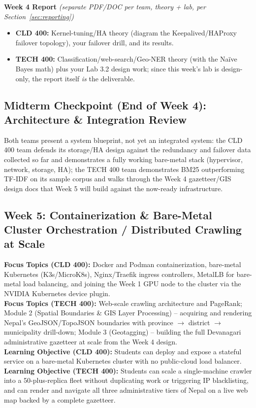 \documentclass[10pt, a4paper]{article}
\newcommand{\weeklyreport}[3]{%
  \par\vspace{0.4em}
  \noindent\colorbox{lightgray!35}{\parbox{\dimexpr\textwidth-2\fboxsep\relax}{%
    \textbf{\color{primary}#1 Report} \textit{(separate PDF/DOC per team, theory + lab, per Section~\ref{sec:reporting})}
    \begin{itemize}
        \item \textbf{CLD 400:} #2
        \item \textbf{TECH 400:} #3
    \end{itemize}
  }}%
  \par\vspace{0.3em}
}
\begin{document}
\weeklyreport{Week 4}{Kernel-tuning/HA theory (diagram the Keepalived/HAProxy failover topology), your failover drill, and its results.}{Classification/web-search/Geo-NER theory (with the Na\"ive Bayes math) plus your Lab 3.2 design work; since this week's lab is design-only, the report itself \emph{is} the deliverable.}

\vspace{0.5em}

\subsection*{Midterm Checkpoint (End of Week 4): Architecture \& Integration Review}
Both teams present a system blueprint, not yet an integrated system: the CLD 400 team defends its storage/HA design against the redundancy and failover data collected so far and demonstrates a fully working bare-metal stack (hypervisor, network, storage, HA); the TECH 400 team demonstrates BM25 outperforming TF-IDF on its sample corpus and walks through the Week 4 gazetteer/GIS design docs that Week 5 will build against the now-ready infrastructure.

\newpage

\subsection*{Week 5: Containerization \& Bare-Metal Cluster Orchestration / Distributed Crawling at Scale}
\textbf{Focus Topics (CLD 400):} Docker and Podman containerization, bare-metal Kubernetes (K3s/MicroK8s), Nginx/Traefik ingress controllers, MetalLB for bare-metal load balancing, and joining the Week 1 GPU node to the cluster via the NVIDIA Kubernetes device plugin. \\[0.35em]
\textbf{Focus Topics (TECH 400):} Web-scale crawling architecture and PageRank; Module 2 (Spatial Boundaries \& GIS Layer Processing) -- acquiring and rendering Nepal's GeoJSON/TopoJSON boundaries with province $\to$ district $\to$ municipality drill-down; Module 3 (Geotagging) -- building the full Devanagari administrative gazetteer at scale from the Week 4 design. \\[0.35em]
\textbf{Learning Objective (CLD 400):} Students can deploy and expose a stateful service on a bare-metal Kubernetes cluster with no public-cloud load balancer. \\[0.35em]
\textbf{Learning Objective (TECH 400):} Students can scale a single-machine crawler into a 50-plus-replica fleet without duplicating work or triggering IP blacklisting, and can render and navigate all three administrative tiers of Nepal on a live web map backed by a complete gazetteer.
\end{document}
